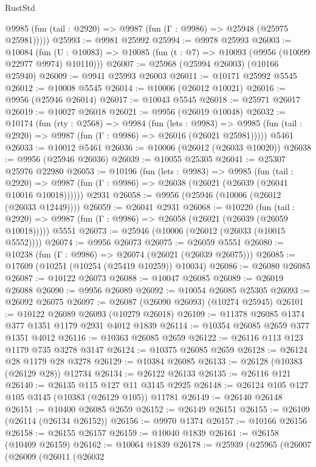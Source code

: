 \begin{lexlean}{RustStd}
\begin{coremodule}
      @9985 (fun (tail : @2920) => @9987 (fun (Γ : @9986) => @25948 (@25975 @25981)))))
@25993 := @9981 @25992
@25994 := @9978 @25993
@26003 := @10084
    (fun (U : @10083) => @10085 (fun (t : @7) => @10093 (@9956 (@10099 @22977 @9974) @10110)))
@26007 := @25968 (@25994 @26003) (@10166 @25940)
@26009 := @9941 @25993 @26003
@26011 := @10171 @25992 @5545
@26012 := @10008 @5545
@26014 := @10006 (@26012 @10021)
@26016 := @9956 (@25946 @26014)
@26017 := @10043 @5545
@26018 := @25971 @26017
@26019 := @10027 @26018
@26021 := @9956 (@26019 @10048)
@26032 := @10174
    (fun (rty : @2568) =>
    @9984
      (fun (lets : @9983) =>
      @9985 (fun (tail : @2920) => @9987 (fun (Γ : @9986) => @26016 (@26021 @25981)))))
    @5461
@26033 := @10012 @5461
@26036 := @10006 (@26012 (@26033 @10020))
@26038 := @9956 (@25946 @26036)
@26039 := @10055 @25305
@26041 := @25307 @25976 @22980
@26053 := @10196
    (fun (lets : @9983) =>
    @9985
      (fun (tail : @2920) =>
      @9987 (fun (Γ : @9986) => @26038 (@26021 (@26039 (@26041 @10016 @10018))))))
    @2931
@26058 := @9956 (@25946 (@10006 (@26012 (@26033 @12449))))
@26059 := @26041 @2931
@26068 := @10220
    (fun (tail : @2920) => @9987 (fun (Γ : @9986) => @26058 (@26021 (@26039 (@26059 @10018)))))
    @5551
@26073 := @25946 (@10006 (@26012 (@26033 (@10015 @5552))))
@26074 := @9956 @26073
@26075 := @26059 @5551
@26080 := @10238 (fun (Γ : @9986) => @26074 (@26021 (@26039 @26075)))
@26085 := @17609 (@10251 (@10254 (@25419 @10259)) @10034)
@26086 := @26080 @26085
@26087 := @10122 @26073
@26088 := @10047 @26085
@26089 := @26019 @26088
@26090 := @9956 @26089
@26092 := @10054 @26085 @25305
@26093 := @26092 @26075
@26097 := @26087 (@26090 @26093) (@10274 @25945)
@26101 := @10122 @26089 @26093 (@10279 @26018)
@26109 := @11378 @26085 @1374 @377 @1351 @1179 @2931 @4012 @1839
@26114 := @10354 @26085 @2659 @377 @1351 @4012
@26116 := @10363 @26085 @2659
@26122 := @26116 @113 @123 @1179 @735 @3278 @3147
@26124 := @10375 @26085 @2659
@26128 := @26124 @28 @1179 @28 @3278
@26129 := @10384 @26085
@26133 := @26128 (@10383 (@26129 @28)) @12734
@26134 := @26122 @26133
@26135 := @26116 @121
@26140 := @26135 @115 @127 @11 @3145 @2925
@26148 := @26124 @105 @127 @105 @3145 (@10383 (@26129 @105)) @11781
@26149 := @26140 @26148
@26151 := @10400 @26085 @2659
@26152 := @26149 @26151
@26155 := @26109 (@26114 (@26134 @26152))
@26156 := @9970 @1374
@26157 := @10166 @26156
@26158 := @26155 @26157
@26159 := @10040 @1839
@26161 := @26158 (@10409 @26159)
@26162 := @10064 @1839
@26178 := @25939
    (@25965
      (@26007
        (@26009
          (@26011
            (@26032

\end{coremodule}
\end{lexlean}
